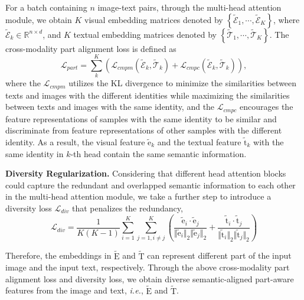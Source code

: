 \documentclass{article}
\begin{document}
For a batch containing $n$ image-text pairs, through the multi-head attention module, we obtain $K$ visual embedding matrices denoted by $\left\{\bm{\tilde{\mathrm{\mathcal{E}}}}_1,\cdots,\bm{\tilde{\mathrm{\mathcal{E}}}}_K\right\}$, where $\bm{\tilde{\mathrm{\mathcal{E}}}}_k \in \mathbb{R}^{n\times d}$, and $K$ textual embedding matrices denoted by $\left\{\bm{\tilde{\mathrm{\mathcal{T}}}}_1,\cdots,\bm{\tilde{\mathrm{\mathcal{T}}}}_K\right\}$.
The cross-modality part alignment loss is defined as
\begin{equation}
\mathcal{L}_{part}=\sum_k^K(\mathcal{L}_{cmpm}(\bm{\tilde{\mathrm{\mathcal{E}}}}_k,\bm{\tilde{\mathrm{\mathcal{T}}}}_k)+\mathcal{L}_{cmpc}(\bm{\tilde{\mathrm{\mathcal{E}}}}_k,\bm{\tilde{{\mathrm{\mathcal{T}}}}}_k)),
\end{equation}
where the $\mathcal{L}_{cmpm}$ utilizes the KL divergence to minimize the similarities between texts and images with the different identities while maximizing the similarities between texts and images with the same identity, and the $\mathcal{L}_{cmpc}$ encourages the feature representations of samples with the same identity to be similar and discriminate from feature representations of other samples with the different identity. 
As a result, the visual feature $\bm{\tilde{\mathrm{e}}}_k$ and the textual feature $\bm{\tilde{\mathrm{t}}}_k$ with the same identity in $k$-th head contain the same semantic information.
\par\textbf{Diversity Regularization.} 
Considering that different head attention blocks could capture the redundant and overlapped semantic information to each other in the multi-head attention module, we take a further step to introduce a diversity loss $\mathcal{L}_{div}$ that penalizes the redundancy,
\begin{equation}
\mathcal{L}_{div}=\frac{1}{K(K-1)}\sum_{i=1}^K\sum_{j=1,i\neq j}^K(\frac{\bm{\tilde{\mathrm{e}}}_{i}\cdot \bm{\tilde{\mathrm{e}}}_{j}} {\Vert \bm{\tilde{\mathrm{e}}}_{i} \Vert_2\Vert \bm{\tilde{\mathrm{e}}}_{j} \Vert_2}+\frac{\bm{\tilde{\mathrm{t}}}_{i}\cdot \bm{\tilde{\mathrm{t}}}_{j}} {\Vert \bm{\tilde{\mathrm{t}}}_{i} \Vert_2\Vert \bm{\tilde{\mathrm{t}}}_{j} \Vert_2})
\end{equation}
\par
Therefore, the embeddings in $\bm{\tilde{\mathrm{E}}}$ and $\bm{\tilde{\mathrm{T}}}$ can represent different part of the input image and the input text, respectively. Through the above cross-modality part alignment loss and diversity loss, we obtain diverse semantic-aligned part-aware features from the image and text, \emph{i.e.}, $\bm{\tilde{\mathrm{E}}}$ and $\bm{\tilde{\mathrm{T}}}$.\par
\end{document}

